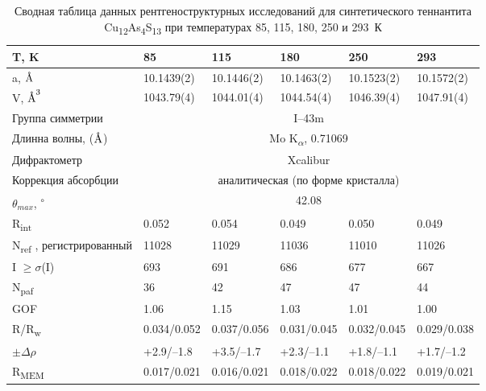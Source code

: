 \begin{landscape}
\begin{table} [htbp]
\centering
\caption{Сводная таблица данных рентгеноструктурных исследований для синтетического теннантита Cu\textsubscript{12}As\textsubscript{4}S\textsubscript{13} при температурах 85, 115, 180, 250 и 293~К}%
	\label{xray1}%
    \renewcommand{\arraystretch}{1.5}
	\begin{tabular}{@{}@{\extracolsep{20pt}}llllll@{}} 
 \toprule     %
T, K                       & 85          & 115         & 180         & 250         & 293         \\ 
   \midrule  
a, $\mbox{\normalfont\AA}$                       & 10.1439(2)  & 10.1446(2)  & 10.1463(2)  & 10.1523(2)  & 10.1572(2)  \\ \hline
V, $\mbox{\normalfont\AA}^3$                      & 1043.79(4)      & 1044.01(4)      & 1044.54(4)      & 1046.39(4)      & 1047.91(4)      \\ \hline
Группа симметрии                     &\multicolumn{5}{c}{ I–43m  }                                         \\ \hline
Длинна волны, ($\mbox{\normalfont\AA}$) & \multicolumn{5}{c}{Mo K\textsubscript{$\alpha$}, 0.71069 } \\ \hline
Дифрактометр             & \multicolumn{5}{c}{Xcalibur}                                       \\ \hline
Коррекция абсорбции      & \multicolumn{5}{c}{аналитическая (по форме кристалла)} \\ \hline
$\theta_{max}$,\textsuperscript{ $\circ$ }                 &  \multicolumn{5}{c}{42.08 } \\ \hline
R\textsubscript{int}                       & 0.052       & 0.054       & 0.049       & 0.050       & 0.049       \\ \hline
N\textsubscript{ref} , регистрированный           & 11028       & 11029       & 11036       & 11010       & 11026       \\ \hline
I $\geq \sigma$(I)                  & 693         & 691         & 686         & 677         & 667         \\ \hline
N\textsubscript{paf}                       & 36          & 42          & 47          & 47          & 44          \\ \hline
GOF                        & 1.06        & 1.15        & 1.03        & 1.01        & 1.00        \\ \hline
R/R\textsubscript{w}                     & 0.034/0.052 & 0.037/0.056 & 0.031/0.045 & 0.032/0.045 & 0.029/0.038 \\ \hline
$\pm\Delta\rho   $                     & +2.9/–1.8   & +3.5/–1.7   & +2.3/–1.1   & +1.8/–1.1   & +1.7/–1.2   \\ \hline
R\textsubscript{MEM}                     & 0.017/0.021 & 0.016/0.021 & 0.018/0.022 & 0.018/0.022 & 0.019/0.021\\ \hline
 \bottomrule 
\end{tabular}
\end{table}
\end{landscape}



